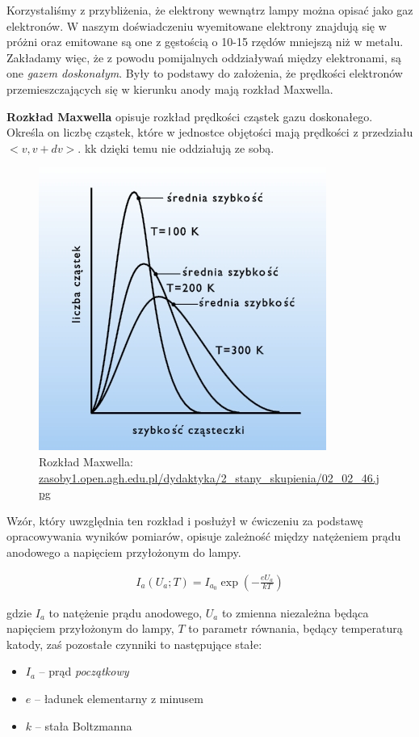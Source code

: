 \documentclass[a4paper]{article}
\newlength{\du}
\begin{document}
Korzystaliśmy z przybliżenia, że elektrony wewnątrz lampy można opisać jako gaz elektronów.
W naszym doświadczeniu wyemitowane elektrony znajdują się w próżni oraz emitowane są one
z gęstością o 10-15 rzędów mniejszą niż w metalu. Zakładamy więc, że z powodu pomijalnych oddziaływań
między elektronami, są one \textit{gazem doskonałym}.
Były to podstawy do założenia, że prędkości elektronów przemieszczających się w kierunku anody 
mają rozkład Maxwella.

\textbf{Rozkład Maxwella} opisuje rozkład prędkości cząstek gazu doskonałego.
Określa on liczbę cząstek, które w jednostce objętości mają prędkości z przedziału $<v, v + dv>$.
kk
dzięki temu nie oddziałują ze sobą. 


\begin{figure}[h!]
\centering
\includegraphics[scale=0.5]{rozlad_maxwella.jpg}
\caption{Rozkład Maxwella: \url{zasoby1.open.agh.edu.pl/dydaktyka/2\_stany\_skupienia/02\_02\_46.jpg}}
\end{figure}

Wzór, który uwzględnia ten rozkład i posłużył w ćwiczeniu za podstawę opracowywania wyników pomiarów,
opisuje zależność między natężeniem prądu anodowego a napięciem przyłożonym do lampy.

\begin{align}
	I_a(U_a; T) = I_{a_0} \exp{\left(-\frac{e U_a}{k T}\right)}
\label{eq1}
\end{align}

gdzie $I_a$ to natężenie prądu anodowego, $U_a$ to zmienna niezależna będąca napięciem przyłożonym do lampy,
$T$ to parametr równania, będący temperaturą katody, zaś pozostałe czynniki to następujące stałe:
\begin{itemize}
\item $I_a$ -- prąd \textit{początkowy}
\item $e$ -- ładunek elementarny z minusem
\item $k$ -- stała Boltzmanna
\end{itemize}
\end{document}

